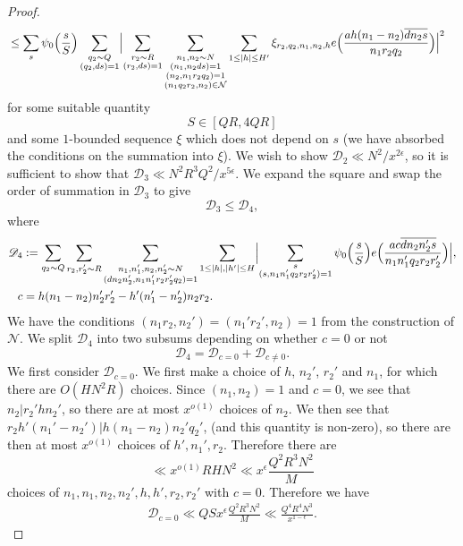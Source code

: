 \documentclass[10pt]{amsart}
\theoremstyle{plain}
\numberwithin{equation}{section}
\begin{document}
\begin{proof}
\begin{align*}
&\le \sum_{s}\psi_0\Bigl(\frac{s}{S}\Bigr)\sum_{\substack{q_2\sim Q\\ (q_2,d s)=1}}\Bigl|\sum_{\substack{r_2\sim R\\ (r_2,d s)=1}}\sum_{\substack{n_1,n_2\sim N\\ (n_1,n_2 d s)=1\\ (n_2,n_1r_2q_2)=1\\(n_1q_2r_2,n_2)\in\mathcal{N}}}\sum_{1\le |h| \le H'}\xi_{r_2,q_2,n_1,n_2,h}e\Bigl(\frac{ah(n_1-n_2)\overline{d n_2 s}}{ n_1 r_2 q_2}\Bigr)\Bigr|^2
\end{align*}
for some suitable quantity 
\[
S\in[QR,4QR]
\]
 and some $1$-bounded sequence $\xi$ which does not depend on $s$ (we have absorbed the conditions on the summation into $\xi$). We wish to show $\mathscr{D}_2\ll N^2/x^{2\epsilon}$, so it is sufficient to show that $\mathscr{D}_3\ll N^2R^3Q^2/x^{5\epsilon}$. We expand the square and swap the order of summation in $\mathscr{D}_3$ to give
\[
\mathscr{D}_3\le \mathscr{D}_4,
\]
where
\begin{align*}
\mathscr{D}_4&:=\sum_{q_2\sim Q}\sum_{\substack{r_2,r_2'\sim R}}\sum_{\substack{n_1,n_1',n_2,n_2'\sim N\\(d n_2n_2',n_1n_1'r_2r_2'q_2)=1}}\sum_{1\le |h|,|h'|\le H}\Bigl|\sum_{\substack{s\\ (s,n_1n_1'q_2r_2r_2')=1}}\psi_0\Bigl(\frac{s}{S}\Bigr)e\Bigl(\frac{a c\overline{d n_2n_2' s}}{n_1n_1'q_2r_2r_2'}\Bigr)\Bigr|,\\
c&=h(n_1-n_2)n_2'r_2'-h'(n_1'-n_2')n_2r_2.
\end{align*}
We have the conditions $(n_1r_2,n_2')=(n_1'r_2',n_2)=1$ from the construction of $\mathcal{N}$. We split $\mathscr{D}_4$ into two subsums depending on whether $c=0$ or not
\begin{equation}
\mathscr{D}_4=\mathscr{D}_{c=0}+\mathscr{D}_{c\ne 0}.\label{eq:D4}
\end{equation}
We first consider $\mathscr{D}_{c=0}$. We first make a choice of $h$, $n_2'$, $r_2'$ and $n_1$, for which there are $O(H N^2R)$ choices. Since $(n_1,n_2)=1$ and $c=0$, we see that $n_2|r_2'h n_2'$, so there are at most $x^{o(1)}$ choices of $n_2$. We then see that $r_2 h'(n_1'-n_2')|h(n_1-n_2)n_2'q_2'$, (and this quantity is non-zero), so there are then at most $x^{o(1)}$ choices of $h',n_1',r_2$. Therefore there are 
\[
\ll x^{o(1)} R H N^2\ll x^\epsilon \frac{Q^2 R^3 N^2}{M}
\]
choices of $n_1,n_1,n_2,n_2',h,h',r_2,r_2'$ with $c=0$. Therefore we have
\begin{align}
\mathscr{D}_{c=0}\ll Q S x^\epsilon \frac{Q^2 R^3 N^2}{M} \ll \frac{Q^4 R^4 N^3}{x^{1-\epsilon}}.\label{eq:DDiag}

\end{align}
\end{proof}
\end{document}
